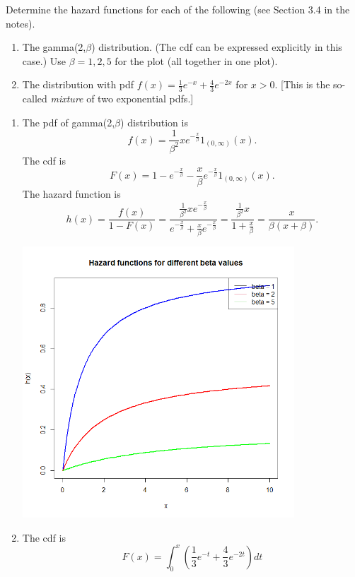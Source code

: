 \documentclass[12pt]{article}
\newenvironment{problem}[2][Problem]{\begin{trivlist}
\item[\hskip \labelsep {\bfseries #1}\hskip \labelsep {\bfseries #2.}]}
{\end{trivlist}}
\begin{document}
\begin{problem}{2}
  Determine the hazard functions for each of the following 
  (see Section 3.4 in the notes).
  \begin{enumerate}
    \item The gamma(2,$\beta$) distribution. (The cdf can be expressed
    explicitly in this case.) Use $\beta = 1,2,5$ for the plot (all together
    in one plot).
    \item The distribution with pdf $f(x) = \frac13 e^{-x} + \frac43 e^{-2x}$
    for $x > 0$. 
    [This is the so-called \textit{mixture} of two exponential pdfs.]
  \end{enumerate}
  \begin{enumerate}
    \item The pdf of gamma(2,$\beta$) distribution is
    \[
      f(x) = \frac{1}{\beta^2} x e^{-\frac{x}{\beta}}1_{(0,\infty)}(x).
    \]
    The cdf is
    \[
      F(x) = 1 - e^{-\frac{x}{\beta}} - \frac{x}{\beta} e^{-\frac{x}{\beta}}
      1_{(0,\infty)}(x).
    \]
    The hazard function is
    \[
      h(x) = \frac{f(x)}{1-F(x)} = \frac{\frac{1}{\beta^2} 
      x e^{-\frac{x}{\beta}}}{e^{-\frac{x}{\beta}} + 
      \frac{x}{\beta} e^{-\frac{x}{\beta}}} = 
      \frac{\frac{1}{\beta^2} x}{1 + \frac{x}{\beta}} = 
      \frac{x}{\beta(x + \beta)}.
    \]
    \begin{center}
      \includegraphics[width=0.8\textwidth]{2a.png}
    \end{center}
    \item The cdf is
    \[
      F(x) = \int_{0}^{x} \left( \frac13 e^{-t} + \frac43 e^{-2t} \right) dt 
\]
\end{enumerate}
\end{problem}
\end{document}
